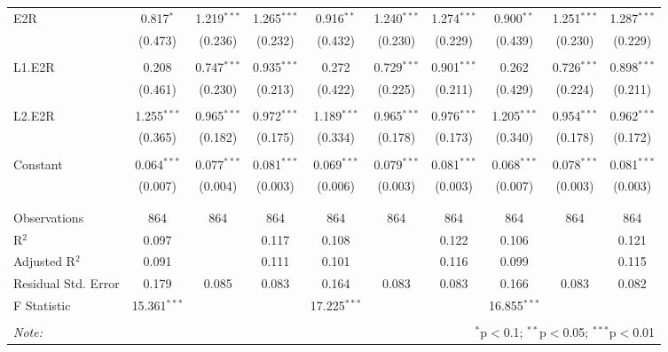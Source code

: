 \documentclass[a4paper]{article}
\begin{document}
\begin{table}[!htbp]
{\begin{tabular}{@{\extracolsep{5pt}}lccccccccc}
 E2R & 0.817$^{*}$ & 1.219$^{***}$ & 1.265$^{***}$ & 0.916$^{**}$ & 1.240$^{***}$ & 1.274$^{***}$ & 0.900$^{**}$ & 1.251$^{***}$ & 1.287$^{***}$ \\ 
  & (0.473) & (0.236) & (0.232) & (0.432) & (0.230) & (0.229) & (0.439) & (0.230) & (0.229) \\ 
  & & & & & & & & & \\ 
 L1.E2R & 0.208 & 0.747$^{***}$ & 0.935$^{***}$ & 0.272 & 0.729$^{***}$ & 0.901$^{***}$ & 0.262 & 0.726$^{***}$ & 0.898$^{***}$ \\ 
  & (0.461) & (0.230) & (0.213) & (0.422) & (0.225) & (0.211) & (0.429) & (0.224) & (0.211) \\ 
  & & & & & & & & & \\ 
 L2.E2R & 1.255$^{***}$ & 0.965$^{***}$ & 0.972$^{***}$ & 1.189$^{***}$ & 0.965$^{***}$ & 0.976$^{***}$ & 1.205$^{***}$ & 0.954$^{***}$ & 0.962$^{***}$ \\ 
  & (0.365) & (0.182) & (0.175) & (0.334) & (0.178) & (0.173) & (0.340) & (0.178) & (0.172) \\ 
  & & & & & & & & & \\ 
 Constant & 0.064$^{***}$ & 0.077$^{***}$ & 0.081$^{***}$ & 0.069$^{***}$ & 0.079$^{***}$ & 0.081$^{***}$ & 0.068$^{***}$ & 0.078$^{***}$ & 0.081$^{***}$ \\ 
  & (0.007) & (0.004) & (0.003) & (0.006) & (0.003) & (0.003) & (0.007) & (0.003) & (0.003) \\ 
  & & & & & & & & & \\ 
\hline \\[-1.8ex] 
Observations & 864 & 864 & 864 & 864 & 864 & 864 & 864 & 864 & 864 \\ 
R$^{2}$ & 0.097 &  & 0.117 & 0.108 &  & 0.122 & 0.106 &  & 0.121 \\ 
Adjusted R$^{2}$ & 0.091 &  & 0.111 & 0.101 &  & 0.116 & 0.099 &  & 0.115 \\ 
Residual Std. Error & 0.179 & 0.085 & 0.083 & 0.164 & 0.083 & 0.083 & 0.166 & 0.083 & 0.082 \\ 
F Statistic & 15.361$^{***}$ &  &  & 17.225$^{***}$ &  &  & 16.855$^{***}$ &  &  \\ 
\hline 
\hline \\[-1.8ex] 
\textit{Note:}  & \multicolumn{9}{r}{$^{*}$p$<$0.1; $^{**}$p$<$0.05; $^{***}$p$<$0.01} \\ 
\end{tabular} 
}
\end{table} 
\FloatBarrier
\end{document}
